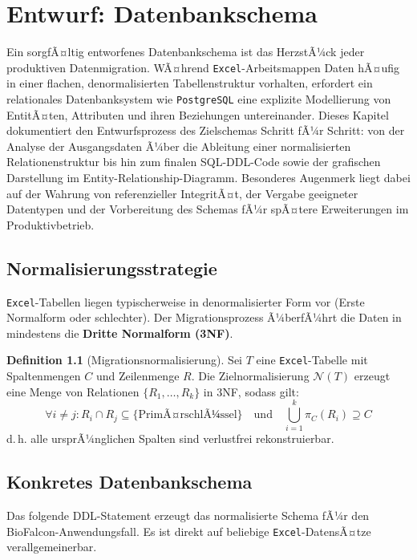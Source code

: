 ﻿\documentclass[12pt,a4paper]{report}
\theoremstyle{definition}
\newtheorem{definition}{Definition}[section]
\theoremstyle{remark}
\newcommand{\excel}{\texttt{Excel}}
\newcommand{\pg}{\texttt{PostgreSQL}}
\begin{document}
\chapter{Entwurf: Datenbankschema}

Ein sorgfÃ¤ltig entworfenes Datenbankschema ist das HerzstÃ¼ck jeder produktiven Datenmigration. WÃ¤hrend \excel{}-Arbeitsmappen Daten hÃ¤ufig in einer flachen, denormalisierten Tabellenstruktur vorhalten, erfordert ein relationales Datenbanksystem wie \pg{} eine explizite Modellierung von EntitÃ¤ten, Attributen und ihren Beziehungen untereinander. Dieses Kapitel dokumentiert den Entwurfsprozess des Zielschemas Schritt fÃ¼r Schritt: von der Analyse der Ausgangsdaten Ã¼ber die Ableitung einer normalisierten Relationenstruktur bis hin zum finalen SQL-DDL-Code sowie der grafischen Darstellung im Entity-Relationship-Diagramm. Besonderes Augenmerk liegt dabei auf der Wahrung von referenzieller IntegritÃ¤t, der Vergabe geeigneter Datentypen und der Vorbereitung des Schemas fÃ¼r spÃ¤tere Erweiterungen im Produktivbetrieb.

\section{Normalisierungsstrategie}
\excel-Tabellen liegen typischerweise in denormalisierter Form vor
(Erste Normalform oder schlechter). Der Migrationsprozess Ã¼berfÃ¼hrt
die Daten in mindestens die \textbf{Dritte Normalform (3NF)}.

\begin{definition}[Migrationsnormalisierung]
  Sei $T$ eine \excel-Tabelle mit Spaltenmengen $C$ und Zeilenmenge $R$.
  Die Zielnormalisierung $\mathcal{N}(T)$ erzeugt eine Menge von
  Relationen $\{R_1, \ldots, R_k\}$ in 3NF, sodass gilt:
  \[
    \forall i \neq j: R_i \cap R_j \subseteq \{\text{PrimÃ¤rschlÃ¼ssel}\}
    \quad\text{und}\quad
    \bigcup_{i=1}^{k} \pi_{C}(R_i) \supseteq C
  \]
  d.\,h. alle ursprÃ¼nglichen Spalten sind verlustfrei rekonstruierbar.
\end{definition}

\section{Konkretes Datenbankschema}

Das folgende DDL-Statement erzeugt das normalisierte Schema fÃ¼r den
BioFalcon-Anwen\-dungsfall. Es ist direkt auf beliebige \excel-DatensÃ¤tze
verallgemeinerbar.
\end{document}
